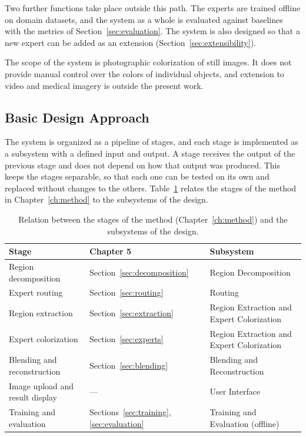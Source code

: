 \documentclass{FastFyp}
\begin{document}
Two further functions take place outside this path. The experts are trained offline on domain datasets, and the system as a whole is evaluated against baselines with the metrics of Section~\ref{sec:evaluation}. The system is also designed so that a new expert can be added as an extension (Section~\ref{sec:extensibility}).

The scope of the system is photographic colorization of still images. It does not provide manual control over the colors of individual objects, and extension to video and medical imagery is outside the present work.

\subsection{Basic Design Approach}

The system is organized as a pipeline of stages, and each stage is implemented as a subsystem with a defined input and output. A stage receives the output of the previous stage and does not depend on how that output was produced. This keeps the stages separable, so that each one can be tested on its own and replaced without changes to the others. Table~\ref{tab:stagemap} relates the stages of the method in Chapter~\ref{ch:method} to the subsystems of the design.

\begin{table}[htbp]
    \centering
    \caption{Relation between the stages of the method (Chapter~\ref{ch:method}) and the subsystems of the design.}
    \label{tab:stagemap}
    \begin{tabular}{p{4.6cm}p{3.4cm}p{5cm}}
        \hline
        \textbf{Stage} & \textbf{Chapter 5} & \textbf{Subsystem} \\
        \hline
        Region decomposition & Section~\ref{sec:decomposition} & Region Decomposition \\
        Expert routing & Section~\ref{sec:routing} & Routing \\
        Region extraction & Section~\ref{sec:extraction} & Region Extraction and Expert Colorization \\
        Expert colorization & Section~\ref{sec:experts} & Region Extraction and Expert Colorization \\
        Blending and reconstruction & Section~\ref{sec:blending} & Blending and Reconstruction \\
        Image upload and result display & --- & User Interface \\
        Training and evaluation & Sections~\ref{sec:training}, \ref{sec:evaluation} & Training and Evaluation (offline) \\
        \hline
    \end{tabular}
\end{table}
\end{document}
